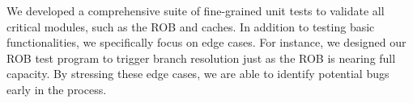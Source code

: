 \label{sec:rob-unittests}

We developed a comprehensive suite of fine-grained unit tests to validate all critical modules, such as the ROB and caches. In addition to testing basic functionalities, we specifically focus on edge cases. For instance, we designed our ROB test program to trigger branch resolution just as the ROB is nearing full capacity. By stressing these edge cases, we are able to identify potential bugs early in the process.